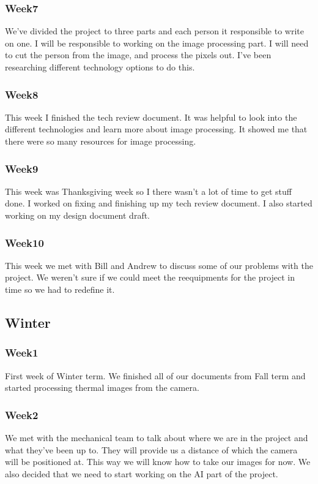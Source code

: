 \subsubsection*{Week7}
	We've divided the project to three parts and each person it responsible to write on one. I will be responsible to working on the image processing part. I will need to cut the person from the image, and process the pixels out. I've been researching different technology options to do this. 
\subsubsection*{Week8}
	This week I finished the tech review document. It was helpful to look into the different technologies and learn more about image processing. It showed me that there were so many resources for image processing. 
\subsubsection*{Week9}
	This week was Thanksgiving week so I there wasn't a lot of time to get stuff done. I worked on fixing and finishing up my tech review document. I also started working on my design document draft. 
\subsubsection*{Week10}
	This week we met with Bill and Andrew to discuss some of our problems with the project. We weren't sure if we could meet the reequipments for the project in time so we had to redefine it.  
	

\subsection*{Winter}
\subsubsection*{Week1}
	First week of Winter term. We finished all of our documents from Fall term and started processing thermal images from the camera. 
\subsubsection*{Week2}
	We met with the mechanical team to talk about where we are in the project and what they've been up to. They will provide us a distance of which the camera will be positioned at. This way we will know how to take our images for now. We also decided that we need to start working on the AI part of the project.  
